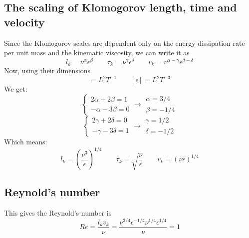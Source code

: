 \documentclass{article}
\begin{document}
\subsection{The scaling of Klomogorov length, time and velocity}
Since the Klomogorov scales are dependent only on the energy dissipation rate per unit mass and the kinematic viscosity, we can write it as
\begin{equation}
    l_k = \nu^\alpha\epsilon^\beta
    \qquad
    \tau_k = \nu^\gamma \epsilon^\delta
    \qquad
    v_k = \nu^{\alpha - \gamma}\epsilon^{\beta - \delta}
\end{equation}
Now, using their dimensions
\begin{equation}
    [\nu] = L^{2}T^{-1}
    \qquad
    [\epsilon] = L^2T^{-3}
\end{equation}
We get:
\begin{equation}
    \begin{cases}
        2\alpha + 2\beta = 1
        \\
        -\alpha - 3\beta = 0
    \end{cases}
    \rightarrow
    \begin{matrix}
        \alpha = 3/4 \\ \beta = -1/4
    \end{matrix}
\end{equation}
\begin{equation}
    \begin{cases}
        2\gamma + 2\delta = 0
        \\
        -\gamma - 3\delta = 1
    \end{cases}
    \rightarrow
    \begin{matrix}
        \gamma = 1/2 \\ \delta = -1/2
    \end{matrix}
\end{equation}
Which means:
\begin{equation}
    l_k = \left(\frac{\nu^3}{\epsilon}\right)^{1/4}
    \qquad
    \tau_k = \sqrt{\frac{\nu}{\epsilon}}
    \qquad
    v_k = \left(\nu\epsilon\right)^{1/4}
\end{equation}
\subsection{Reynold's number}
This gives the Reynold's number is
\begin{equation}
    Re = \frac{l_k v_k}{\nu} = \frac{\nu^{3/4}\epsilon^{-1/4}\nu^{1/4}\epsilon^{1/4}}{\nu} = 1
\end{equation}
\end{document}
